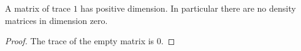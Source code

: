 \begin{lemma}
    \label{lem:density_dimension_positive}
    \leanok
    A matrix of trace $1$ has positive dimension. In particular there are
    no density matrices in dimension zero.
\end{lemma}
\begin{proof}\leanok
    The trace of the empty matrix is $0$.
\end{proof}
\endinput
